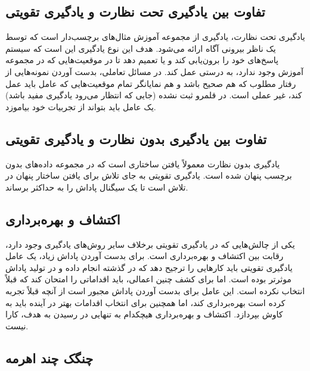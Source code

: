 \subsection*{تفاوت بین یادگیری تحت نظارت و یادگیری تقویتی}
یادگیری تحت نظارت، یادگیری از مجموعه آموزش مثال‌های برچسب‌دار است که توسط یک ناظر بیرونی آگاه ارائه می‌شود. هدف این نوع یادگیری این است که سیستم پاسخ‌های خود را برون‌یابی کند و یا تعمیم دهد تا در موقعیت‌هایی که در مجموعه آموزش وجود ندارد، به درستی عمل کند. در مسائل تعاملی، بدست آوردن نمونه‌هایی از رفتار مطلوب که هم صحیح باشد و هم نمایانگر تمام موقعیت‌هایی که عامل باید عمل کند، غیر عملی است. در قلمرو ثبت نشده (جایی که انتظار می‌رود یادگیری مفید باشد) یک عامل باید بتواند از تجربیات خود بیاموزد.

\subsection*{تفاوت بین یادگیری بدون نظارت و یادگیری تقویتی}
یادگیری بدون نظارت معمولاً یافتن ساختاری است که در مجموعه داده‌های بدون برچسب پنهان شده است. یادگیری تقویتی به جای تلاش برای یافتن ساختار پنهان در تلاش است تا یک سیگنال پاداش را به حداکثر برساند.

\subsection*{اکتشاف و بهره‌برداری}
یکی از چالش‌هایی که در یادگیری تقویتی برخلاف سایر روش‌های یادگیری وجود دارد، رقابت بین اکتشاف و بهره‌برداری است. برای بدست آوردن پاداش زیاد، یک عامل یادگیری تقویتی باید کارهایی را ترجیح دهد که در گذشته انجام داده و در تولید پاداش موثرتر بوده است. اما برای کشف چنین اعمالی، باید اقداماتی را امتحان کند که قبلاً انتخاب نکرده است. این عامل برای بدست آوردن پاداش مجبور است از آنچه قبلاً تجربه کرده است بهره‌برداری کند، اما همچنین برای انتخاب اقدامات بهتر در آینده باید به کاوش بپردازد. 
اکتشاف و بهره‌برداری هیچکدام به تنهایی در رسیدن به هدف، کارا نیست.
\subsection{چنگک چند اهرمه}

